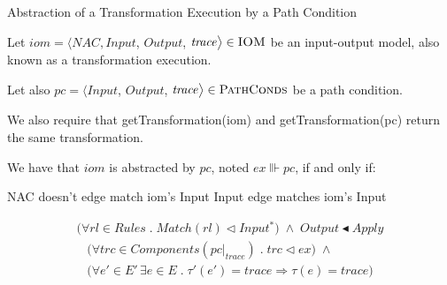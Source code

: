 \begin{definition}{Abstraction of a Transformation Execution by a Path Condition\\}
\label{def:abstraction_pc_ex}

Let $iom = \big\langle \mathit{NAC}, \mathit{Input}$, $\mathit{Output}$, $\mathit{trace}\big\rangle \in \textsc{IOM}$ be an input-output model, also known as a transformation execution. 

Let also $pc = \big\langle \mathit{Input}$, $\mathit{Output}$, $\mathit{trace}\big\rangle  \in \textsc{PathConds}$ be a path condition.

We also require that getTransformation(iom) and getTransformation(pc) return the same transformation.

We have that $iom$ is abstracted by $pc$, noted $ex\Vvdash pc$, if and only if:

NAC doesn't edge match iom's Input
Input edge matches iom's Input





\begin{multline}
\label{eq:abstr_input_output}
\big(\forall rl\in Rules\;.\;Match(rl) \vartriangleleft Input^*\big) \;\land\; Output \blacktriangleleft Apply
\end{multline}
\begin{multline}
\label{eq:abstr_trace}
\big(\forall trc\in Components(pc|_{trace})\;.\;trc\vartriangleleft ex\big)\;\land\;\\
\big(\forall e'\in E'\, \exists e\in E\;.\;\tau'(e')=trace \Longrightarrow \tau(e)=trace\big)
\end{multline} 

  

  
  
\end{definition} 


